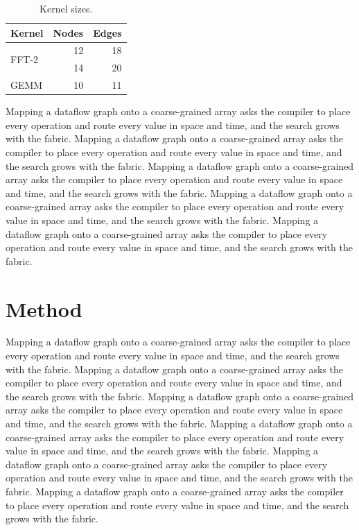 \documentclass[twocolumn]{article}
\begin{document}
\begin{table}[h]
  \centering
  \caption{Kernel sizes.}
  \label{tab:small}
  \begin{tabular}{lrr}
    \hline
    Kernel & Nodes & Edges \\
    \hline
    \multirow{2}{*}{FFT-2} & 12 & 18 \\
     & 14 & 20 \\
    GEMM & 10 & 11 \\
    \hline
  \end{tabular}
\end{table}

Mapping a dataflow graph onto a coarse-grained array asks the compiler to place every operation and route every value in space and time, and the search grows with the fabric. Mapping a dataflow graph onto a coarse-grained array asks the compiler to place every operation and route every value in space and time, and the search grows with the fabric. Mapping a dataflow graph onto a coarse-grained array asks the compiler to place every operation and route every value in space and time, and the search grows with the fabric. Mapping a dataflow graph onto a coarse-grained array asks the compiler to place every operation and route every value in space and time, and the search grows with the fabric. Mapping a dataflow graph onto a coarse-grained array asks the compiler to place every operation and route every value in space and time, and the search grows with the fabric.

\section{Method}
Mapping a dataflow graph onto a coarse-grained array asks the compiler to place every operation and route every value in space and time, and the search grows with the fabric. Mapping a dataflow graph onto a coarse-grained array asks the compiler to place every operation and route every value in space and time, and the search grows with the fabric. Mapping a dataflow graph onto a coarse-grained array asks the compiler to place every operation and route every value in space and time, and the search grows with the fabric. Mapping a dataflow graph onto a coarse-grained array asks the compiler to place every operation and route every value in space and time, and the search grows with the fabric. Mapping a dataflow graph onto a coarse-grained array asks the compiler to place every operation and route every value in space and time, and the search grows with the fabric. Mapping a dataflow graph onto a coarse-grained array asks the compiler to place every operation and route every value in space and time, and the search grows with the fabric.
\end{document}
